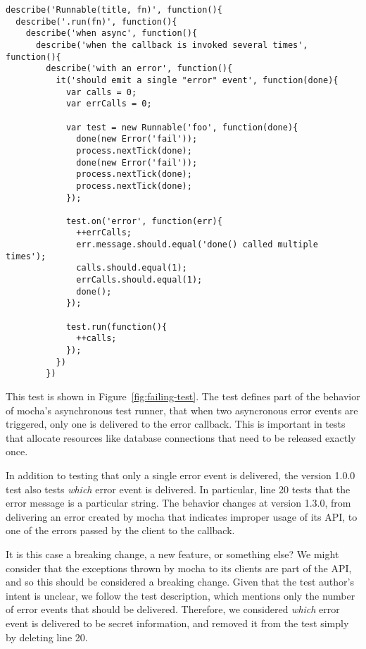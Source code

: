 \begin{figure*}
\begin{lstlisting}
describe('Runnable(title, fn)', function(){
  describe('.run(fn)', function(){
    describe('when async', function(){
      describe('when the callback is invoked several times', function(){
        describe('with an error', function(){
          it('should emit a single "error" event', function(done){
            var calls = 0;
            var errCalls = 0;

            var test = new Runnable('foo', function(done){
              done(new Error('fail'));
              process.nextTick(done);
              done(new Error('fail'));
              process.nextTick(done);
              process.nextTick(done);
            });

            test.on('error', function(err){
              ++errCalls;
              err.message.should.equal('done() called multiple times');
              calls.should.equal(1);
              errCalls.should.equal(1);
              done();
            });

            test.run(function(){
              ++calls;
            });
          })
        })
\end{lstlisting}
\caption{A failing mocha jsapi test}
\label{fig:failing-test}
\end{figure*}

This test is shown in Figure~\ref{fig:failing-test}. The test defines
part of the behavior of mocha's asynchronous test runner, that when
two asyncronous error events are triggered, only one is delivered to
the error callback. This is important in tests that allocate resources
like database connections that need to be released exactly once.

In addition to testing that only a single error event is delivered,
the version 1.0.0 test also tests {\em which} error event is
delivered. In particular, line 20 tests that the error message is a
particular string. The behavior changes at version 1.3.0, from
delivering an error created by mocha that indicates improper usage of
its API, to one of the errors passed by the client to the callback.

It is this case a breaking change, a new feature, or something else?
We might consider that the exceptions thrown by mocha to its clients
are part of the API, and so this should be considered a breaking
change.  Given that the test author's intent is unclear, we follow the
test description, which mentions only the number of error events that
should be delivered. Therefore, we considered {\em which} error event
is delivered to be secret information, and removed it from the test
simply by deleting line 20.

